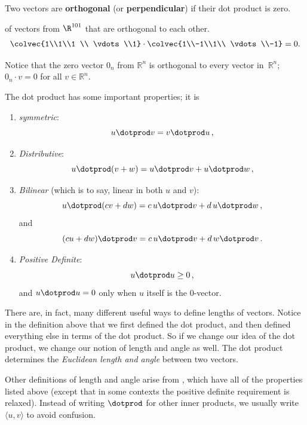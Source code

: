 \begin{definition} 
Two vectors are \hypertarget{orthog}{{\bf orthogonal}} (or {\bf perpendicular}) if their dot product is zero.
\end{definition} 


\begin{example} of vectors from $\R^{101}$ that are orthogonal to each other.\\
\[
\colvec{1\\1\\1 \\ \vdots \\1} \cdot \colvec{1\\-1\\1\\ \vdots \\-1} =0.
\]
\end{example}

Notice that the zero vector $0_n$ from $\mathbb{R}^n$ is orthogonal to every vector in~$\mathbb{R}^n$; $0_n\cdot v=0$ for all $v \in \mathbb{R}^n$.

\vspace{2mm}\noindent
The dot product has some important properties; it is
\begin{enumerate}
\item  \emph{symmetric}:  
\[u\dotprod v = v\dotprod u\, ,\]
\item \emph{Distributive}:  \[u\dotprod (v+w) = u\dotprod v + u\dotprod w\, ,\]
\item \emph{Bilinear} (which is to say, linear in both $u$ and $v$):  
\[ u\dotprod (cv+dw) = c \, u\dotprod v +d \, u\dotprod w\, ,\] and 
\[(cu+dw)\dotprod v = c\, u\dotprod v + d\, w\dotprod v\, .\]
\item \emph{Positive Definite}: \[u\dotprod u \geq 0\, ,\] and  $u\dotprod u = 0$ only when $u$ itself is the $0$-vector.
\end{enumerate}

There are, in fact, many different useful ways to define lengths of vectors.  Notice in the definition above that we first defined the dot product, and then defined everything else in terms of the dot product.  So if we change our idea of the dot product, we change our notion of length and angle as well.  The dot product determines the \emph{Euclidean length and angle} between two vectors.  

Other definitions of length and angle arise from , which have all of the properties listed above
(except that in some contexts the positive definite requirement is relaxed). Instead of writing $\dotprod$ for other inner products, we usually write $\langle u,v \rangle$ to avoid confusion.

